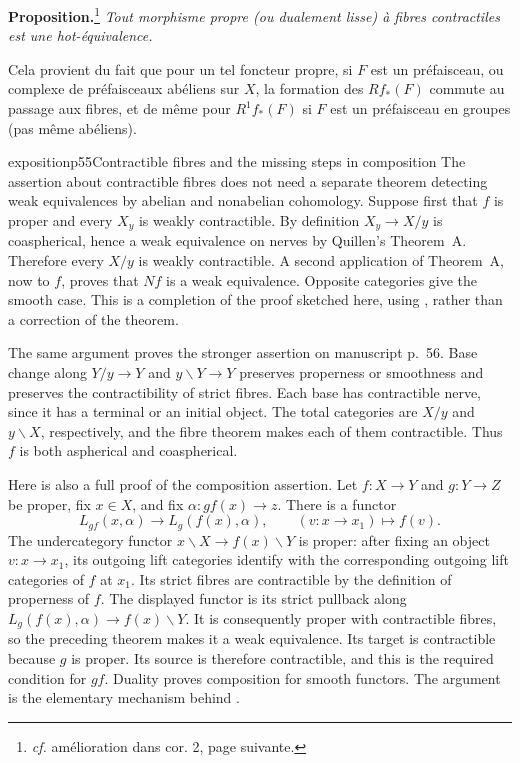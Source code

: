 \noindent\textbf{Proposition.}\footnote[24]{\textit{cf.} amélioration dans cor. 2, page suivante.} \textit{Tout morphisme propre (ou dualement lisse) à fibres contractiles est une hot-équivalence.}

\noindent{}
Cela provient du fait que pour un tel foncteur propre, si $F$ est un préfaisceau, ou complexe de préfaisceaux abéliens sur $X$, la formation des $Rf_*(F)$ commute au passage aux fibres, et de même pour $R^1f_*(F)$ si $F$ est un préfaisceau en groupes (pas même abéliens).

\begin{dcomment}{exposition}{p55}{Contractible fibres and the missing steps in composition}
The assertion about contractible fibres does not need a separate theorem detecting weak equivalences by abelian and nonabelian cohomology. Suppose first that $f$ is proper and every $X_y$ is weakly contractible. By definition $X_y\to X/y$ is coaspherical, hence a weak equivalence on nerves by Quillen's Theorem~A. Therefore every $X/y$ is weakly contractible. A second application of Theorem~A, now to $f$, proves that $Nf$ is a weak equivalence. Opposite categories give the smooth case. This is a completion of the proof sketched here, using \citet[\S1, Theorem~A]{Quillen1973}, rather than a correction of the theorem.

The same argument proves the stronger assertion on manuscript p.~56. Base change along $Y/y\to Y$ and $y\backslash Y\to Y$ preserves properness or smoothness and preserves the contractibility of strict fibres. Each base has contractible nerve, since it has a terminal or an initial object. The total categories are $X/y$ and $y\backslash X$, respectively, and the fibre theorem makes each of them contractible. Thus $f$ is both aspherical and coaspherical.

Here is also a full proof of the composition assertion. Let $f:X\to Y$ and $g:Y\to Z$ be proper, fix $x\in X$, and fix $\alpha:gf(x)\to z$. There is a functor
\[
 L_{gf}(x,\alpha)\longrightarrow L_g(f(x),\alpha),
 \qquad (v:x\to x_1)\longmapsto f(v).
\]
The undercategory functor $x\backslash X\to f(x)\backslash Y$ is proper: after fixing an object $v:x\to x_1$, its outgoing lift categories identify with the corresponding outgoing lift categories of $f$ at $x_1$. Its strict fibres are contractible by the definition of properness of $f$. The displayed functor is its strict pullback along $L_g(f(x),\alpha)\to f(x)\backslash Y$. It is consequently proper with contractible fibres, so the preceding theorem makes it a weak equivalence. Its target is contractible because $g$ is proper. Its source is therefore contractible, and this is the required condition for $gf$. Duality proves composition for smooth functors. The argument is the elementary mechanism behind \citet[Propositions~3.2.6 and~3.2.10]{Maltsiniotis2020}.


\end{dcomment}
